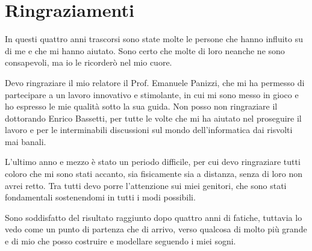 \chapter{Ringraziamenti}
\label{ch:ringr}

In questi quattro anni trascorsi sono state molte le persone che hanno influito su di me e che mi hanno aiutato. Sono certo che molte di loro neanche ne sono consapevoli, ma io le ricorderò nel mio cuore.

Devo ringraziare il mio relatore il Prof. Emanuele Panizzi, che mi ha permesso di partecipare a un lavoro innovativo e stimolante, in cui mi sono messo in gioco e ho espresso le mie qualità sotto la sua guida. Non posso non ringraziare il dottorando Enrico Bassetti, per tutte le volte che mi ha aiutato nel proseguire il lavoro e per le interminabili discussioni sul mondo dell'informatica dai risvolti mai banali.
 
L'ultimo anno e mezzo è stato un periodo difficile, per cui devo ringraziare tutti coloro che mi sono stati accanto, sia fisicamente sia a distanza, senza di loro non avrei retto. Tra tutti devo porre l'attenzione sui miei genitori, che sono stati fondamentali sostenendomi in tutti i modi possibili.

Sono soddisfatto del risultato raggiunto dopo quattro anni di fatiche, tuttavia lo vedo come un punto di partenza che di arrivo, verso qualcosa di molto più grande e di mio che posso costruire e modellare seguendo i miei sogni.

